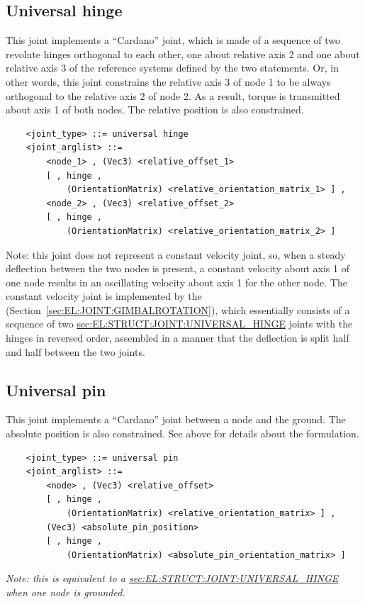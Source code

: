 \subsection{Universal hinge}
\label{sec:EL:STRUCT:JOINT:UNIVERSAL_HINGE}
This joint implements a ``Cardano'' joint, which is made of a sequence
of two revolute hinges orthogonal to each other, one about relative axis 2
and one about relative axis 3 of the reference systems
defined by the two  statements.
Or, in other words, this joint constrains the relative axis 3 of node 1 
to be always orthogonal to the relative axis 2 of node 2.
As a result, torque is transmitted about axis 1 of both nodes.
The relative position is also constrained.
\begin{verbatim}
    <joint_type> ::= universal hinge
    <joint_arglist> ::= 
        <node_1> , (Vec3) <relative_offset_1> 
        [ , hinge , 
            (OrientationMatrix) <relative_orientation_matrix_1> ] ,
        <node_2> , (Vec3) <relative_offset_2>
        [ , hinge , 
            (OrientationMatrix) <relative_orientation_matrix_2> ]
\end{verbatim}
Note: this joint does not represent a constant velocity joint,
so, when a steady deflection between the two nodes is present,
a constant velocity about axis 1 of one node results in an oscillating
velocity about axis 1 for the other node.
The constant velocity joint is implemented by the 
(Section~\ref{sec:EL:JOINT:GIMBALROTATION}), which essentially consists
of a sequence of two
\hyperref{\kw{universal hinge}}{\kw{universal hinge} (see Section~}{)}{sec:EL:STRUCT:JOINT:UNIVERSAL_HINGE}
joints with the hinges in reversed order, assembled
in a manner that the deflection is split half and half
between the two joints.

\subsection{Universal pin}
This joint implements a ``Cardano'' joint between a node and the ground.
The absolute position is also constrained.
See above for details about the formulation.
\begin{verbatim}
    <joint_type> ::= universal pin
    <joint_arglist> ::= 
        <node> , (Vec3) <relative_offset>
        [ , hinge , 
            (OrientationMatrix) <relative_orientation_matrix> ] ,
        (Vec3) <absolute_pin_position>
        [ , hinge , 
            (OrientationMatrix) <absolute_pin_orientation_matrix> ]
\end{verbatim}
\emph{Note: this is equivalent to a
\hyperref{\kw{universal hinge}}{\kw{universal hinge} (see Section~}{)}{sec:EL:STRUCT:JOINT:UNIVERSAL_HINGE}
when one node is grounded.
}

